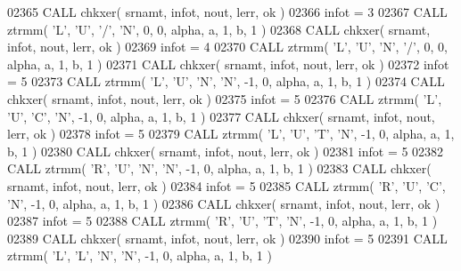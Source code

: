 \begin{DoxyCode}
02365       \textcolor{keyword}{CALL }chkxer( srnamt, infot, nout, lerr, ok )
02366       infot = 3
02367       \textcolor{keyword}{CALL }ztrmm( \textcolor{stringliteral}{'L'}, \textcolor{stringliteral}{'U'}, \textcolor{stringliteral}{'/'}, \textcolor{stringliteral}{'N'}, 0, 0, alpha, a, 1, b, 1 )
02368       \textcolor{keyword}{CALL }chkxer( srnamt, infot, nout, lerr, ok )
02369       infot = 4
02370       \textcolor{keyword}{CALL }ztrmm( \textcolor{stringliteral}{'L'}, \textcolor{stringliteral}{'U'}, \textcolor{stringliteral}{'N'}, \textcolor{stringliteral}{'/'}, 0, 0, alpha, a, 1, b, 1 )
02371       \textcolor{keyword}{CALL }chkxer( srnamt, infot, nout, lerr, ok )
02372       infot = 5
02373       \textcolor{keyword}{CALL }ztrmm( \textcolor{stringliteral}{'L'}, \textcolor{stringliteral}{'U'}, \textcolor{stringliteral}{'N'}, \textcolor{stringliteral}{'N'}, -1, 0, alpha, a, 1, b, 1 )
02374       \textcolor{keyword}{CALL }chkxer( srnamt, infot, nout, lerr, ok )
02375       infot = 5
02376       \textcolor{keyword}{CALL }ztrmm( \textcolor{stringliteral}{'L'}, \textcolor{stringliteral}{'U'}, \textcolor{stringliteral}{'C'}, \textcolor{stringliteral}{'N'}, -1, 0, alpha, a, 1, b, 1 )
02377       \textcolor{keyword}{CALL }chkxer( srnamt, infot, nout, lerr, ok )
02378       infot = 5
02379       \textcolor{keyword}{CALL }ztrmm( \textcolor{stringliteral}{'L'}, \textcolor{stringliteral}{'U'}, \textcolor{stringliteral}{'T'}, \textcolor{stringliteral}{'N'}, -1, 0, alpha, a, 1, b, 1 )
02380       \textcolor{keyword}{CALL }chkxer( srnamt, infot, nout, lerr, ok )
02381       infot = 5
02382       \textcolor{keyword}{CALL }ztrmm( \textcolor{stringliteral}{'R'}, \textcolor{stringliteral}{'U'}, \textcolor{stringliteral}{'N'}, \textcolor{stringliteral}{'N'}, -1, 0, alpha, a, 1, b, 1 )
02383       \textcolor{keyword}{CALL }chkxer( srnamt, infot, nout, lerr, ok )
02384       infot = 5
02385       \textcolor{keyword}{CALL }ztrmm( \textcolor{stringliteral}{'R'}, \textcolor{stringliteral}{'U'}, \textcolor{stringliteral}{'C'}, \textcolor{stringliteral}{'N'}, -1, 0, alpha, a, 1, b, 1 )
02386       \textcolor{keyword}{CALL }chkxer( srnamt, infot, nout, lerr, ok )
02387       infot = 5
02388       \textcolor{keyword}{CALL }ztrmm( \textcolor{stringliteral}{'R'}, \textcolor{stringliteral}{'U'}, \textcolor{stringliteral}{'T'}, \textcolor{stringliteral}{'N'}, -1, 0, alpha, a, 1, b, 1 )
02389       \textcolor{keyword}{CALL }chkxer( srnamt, infot, nout, lerr, ok )
02390       infot = 5
02391       \textcolor{keyword}{CALL }ztrmm( \textcolor{stringliteral}{'L'}, \textcolor{stringliteral}{'L'}, \textcolor{stringliteral}{'N'}, \textcolor{stringliteral}{'N'}, -1, 0, alpha, a, 1, b, 1 )

\end{DoxyCode}
